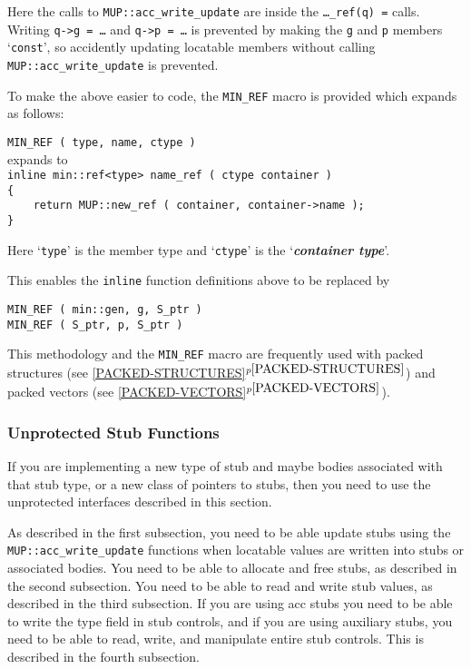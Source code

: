 \documentclass[12pt]{article}
\makeatletter
\newcommand{\key}[1]{{\bf \em #1}\index{#1}}
\newcommand{\ttnbkey}[1]{{\tt #1}\index{#1@{\tt #1}}}
\newcommand{\itemref}[1]{\ref{#1}$^{p\pageref{#1}}$}
\newcommand{\EOL}{\penalty \exhyphenpenalty}
\newenvironment{indpar}[1][0.3in]%
	{\begin{list}{}%
		     {\setlength{\itemsep}{0in}%
		      \setlength{\topsep}{0in}%
		      \setlength{\parsep}{1ex}%
		      \setlength{\labelwidth}{#1}%
		      \setlength{\leftmargin}{#1}%
		      \addtolength{\leftmargin}{\labelsep}}%
	 \item}%
	{\end{list}}
\newcommand{\LABEL}[1]{\label{#1}}
\newcommand{\TTNBKEY}[1]{\ttnbkey{#1}}
\makeatother
\begin{document}
Here the calls to {\tt MUP::acc\_write\_update} are inside the
{\tt \ldots\_ref(q) =} calls.  Writing {\tt q->g = \ldots}
and {\tt q->p = \ldots} is prevented by making the {\tt g} and {\tt p}
members `{\tt const}', so accidently updating locatable members
without calling {\tt MUP::\EOL acc\_\EOL write\_\EOL update}
is prevented.

To make the above easier to code, the {\tt MIN\_REF} macro
is provided which expands as follows:

\begin{indpar}
\TTNBKEY{MIN\_REF}\verb| ( type, name, ctype )|
\LABEL{MIN_REF}
\\[1ex]
expands to \\[1ex]
\verb|inline min::ref<type> name_ref ( ctype container )| \\
\verb|{| \\
\verb|    return MUP::new_ref ( container, container->name );| \\
\verb|}|
\end{indpar}

Here `{\tt type}' is the member type and `{\tt ctype}' is
the `\key{container type}'.

This enables the {\tt inline} function definitions above to be
replaced by

\begin{indpar}\begin{verbatim}
MIN_REF ( min::gen, g, S_ptr )
MIN_REF ( S_ptr, p, S_ptr )
\end{verbatim}\end{indpar}

This methodology and the {\tt MIN\_\EOL REF} macro are frequently
used with packed structures (see \itemref{PACKED-STRUCTURES}) and
packed vectors (see \itemref{PACKED-VECTORS}).

\subsubsection{Unprotected Stub Functions}
\label{UNPROTECTED-STUB-FUNCTIONS}

If you are implementing a new type of stub and maybe bodies
associated with that stub type, or a new class of pointers to stubs,
then you need to use the unprotected
interfaces described in this section.

As described in the first subsection, you need to be able update stubs
using the {\tt MUP::\EOL acc\_\EOL write\_\EOL update} functions
when locatable values are written into stubs or associated bodies.
You need to be able to allocate and free stubs, as described in the
second subsection.  You need to be able to read and write stub values,
as described in the third subsection.  If you are using acc stubs you
need to be able to write the type field in stub controls, and if
you are using auxiliary stubs, you need to be able to read, write,
and manipulate entire stub controls.
This is described in the fourth subsection.
\end{document}
